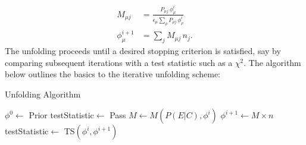 \begin{align*}
	M_{\mu j} &= \frac{P_{\mu j} \, \phi^{i}_{\mu}}{\epsilon_{\mu} \sum_{\rho}{P_{\rho j} \, \phi^{i}_{\rho}}}
	\\
	\phi^{i+1}_{\mu} &= \sum_{j}{M_{\mu j} \, n_{j}}.
\end{align*}
The unfolding proceeds until a desired stopping criterion is satisfied, say by comparing subsequent iterations with a test statistic such as a $\chi^{2}$. 
The algorithm below outlines the basics to the iterative unfolding scheme:
\begin{algorithm}
  \caption{Unfolding Algorithm}
  \begin{algorithmic}
  	\State $\phi^{0}\gets$ Prior
	\State testStatistic$\gets$ Pass
		\State $M\gets M(P(E|C),\phi^{i})$
		\State $\phi^{i+1}\gets M \times n$
		\State testStatistic$\gets$ TS$(\phi^{i},\phi^{i+1})$
	\EndWhile
  \end{algorithmic}
\end{algorithm}
